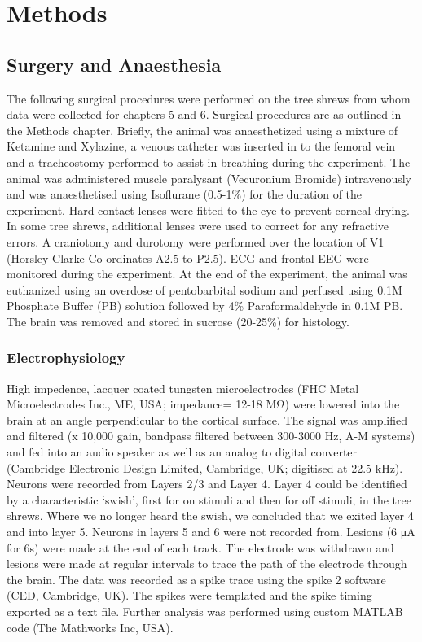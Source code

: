\section{Methods}


\subsection{Surgery and Anaesthesia}

The following surgical procedures were performed on the tree shrews from whom data were collected for chapters 5 and 6. Surgical procedures are as outlined in the Methods chapter. Briefly, the animal was anaesthetized using a mixture of Ketamine and Xylazine, a venous catheter was inserted in to the femoral vein and a tracheostomy performed to assist in breathing during the experiment. The animal was administered muscle paralysant (Vecuronium Bromide) intravenously and was anaesthetised using Isoflurane (0.5-1\%) for the duration of the experiment. Hard contact lenses were fitted to the eye to prevent corneal drying. In some tree shrews, additional lenses were used to correct for any refractive errors. A craniotomy and durotomy were performed over the location of V1 (Horsley-Clarke Co-ordinates A2.5 to P2.5). ECG and frontal EEG were monitored during the experiment. At the end of the experiment, the animal was euthanized using an overdose of pentobarbital sodium and perfused using 0.1M Phosphate Buffer (PB) solution followed by 4\% Paraformaldehyde in 0.1M PB. The brain was removed and stored in sucrose (20-25\%) for histology.

	\subsubsection{Electrophysiology}
High impedence, lacquer coated tungsten microelectrodes (FHC Metal Microelectrodes Inc., ME, USA; impedance= 12-18 MΩ) were lowered into the brain at an angle perpendicular to the cortical surface. The signal was amplified and filtered (x 10,000 gain, bandpass filtered between 300-3000 Hz, A-M systems) and fed into an audio speaker as well as an analog to digital converter (Cambridge Electronic Design Limited, Cambridge, UK; digitised at 22.5 kHz). Neurons were recorded from Layers 2/3 and Layer 4. Layer 4 could be identified by a characteristic ‘swish’, first for on stimuli and then for off stimuli, in the tree shrews. Where we no longer heard the swish, we concluded that we exited layer 4 and into layer 5. Neurons in layers 5 and 6 were not recorded from. Lesions (6 μA for 6s) were made at the end of each track. The electrode was withdrawn and lesions were made at regular intervals to trace the path of the electrode through the brain. The data was recorded as a spike trace using the spike 2 software (CED, Cambridge, UK). The spikes were templated and the spike timing exported as a text file. Further analysis was performed using custom MATLAB code (The Mathworks Inc, USA).
